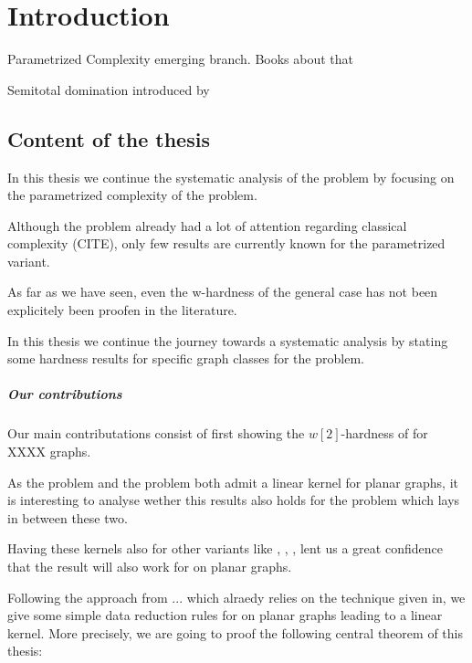 \chapter{Introduction}


Parametrized Complexity emerging branch. Books about that

Semitotal domination introduced by 
\section{Content of the thesis}

In this thesis we continue the systematic analysis of the \sdom problem by focusing on the parametrized complexity of the problem. 

Although the problem already had a lot of attention regarding classical complexity (CITE), only few results are currently known for the parametrized variant. 

As far as we have seen, even the w-hardness of the general case has not been explicitely been proofen in the literature. 

In this thesis we continue the journey towards a systematic analysis by stating some hardness results for specific graph classes for the problem.

\paragraph{Our contributions}

Our main contributations consist of first showing the $w[2]$-hardness of \sdom for XXXX graphs.

\noindent As the \dom problem and the \tdom problem both admit a linear kernel for planar graphs, it is interesting to analyse wether this results also holds for the \sdom problem which lays in between these two. 

Having these kernels also for other variants like \eddom, \efdom, \cdom, \rbdom lent us a great confidence that the result will also work for \sdom on planar graphs.


Following the approach from ... which alraedy relies on the technique given in, we give some simple data reduction rules for \sdom on planar graphs leading to a linear kernel. More precisely, we are going to proof the following central theorem of this thesis:

